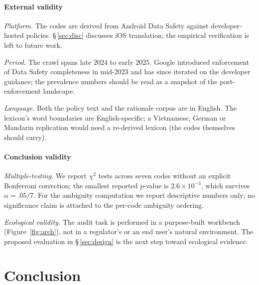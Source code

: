 \documentclass[11pt,a4paper]{article}
\begin{document}
\paragraph{External validity}
\emph{Platform.} The codes are derived from Android Data Safety
against developer-hosted policies. \S\,\ref{sec:disc} discusses iOS
translation; the empirical verification is left to future work.

\emph{Period.} The crawl spans late $2024$ to early $2025$. Google
introduced enforcement of Data Safety completeness in mid-$2023$ and
has since iterated on the developer guidance; the prevalence numbers
should be read as a snapshot of the post-enforcement landscape.

\emph{Language.} Both the policy text and the rationale corpus are
in English. The lexicon's word boundaries are English-specific; a
Vietnamese, German or Mandarin replication would need a re-derived
lexicon (the codes themselves should carry).

\paragraph{Conclusion validity}
\emph{Multiple-testing.} We report $\chi^2$ tests across seven codes
without an explicit Bonferroni correction; the smallest reported
$p$-value is $2.6\!\times\!10^{-4}$, which survives $\alpha=.05/7$.
For the ambiguity computation we report descriptive numbers only;
no significance claim is attached to the per-code ambiguity ordering.

\emph{Ecological validity.} The audit task is performed in a
purpose-built workbench (Figure~\ref{fig:arch}), not in a regulator's
or an end user's natural environment. The proposed evaluation in
\S\,\ref{sec:design} is the next step toward ecological evidence.

\section{Conclusion}\label{sec:concl}
\end{document}
